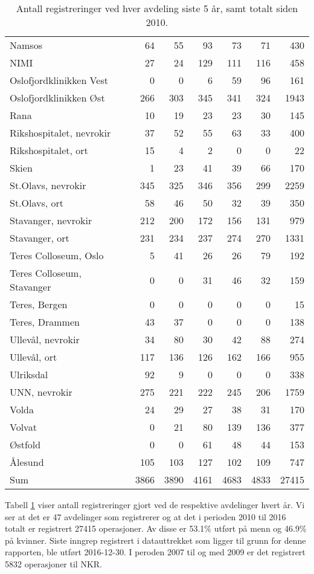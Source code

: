 \documentclass [norsk,a4paper,twoside]{article}\usepackage[]{graphicx}\usepackage[]{color}
\begin{document}
\begin{table}[ht]
\begin{tabular}{lrrrrrr}
  Namsos & 64 & 55 & 93 & 73 & 71 & 430 \\ 
  NIMI & 27 & 24 & 129 & 111 & 116 & 458 \\ 
  Oslofjordklinikken Vest & 0 & 0 & 6 & 59 & 96 & 161 \\ 
  Oslofjordklinikken Øst & 266 & 303 & 345 & 341 & 324 & 1943 \\ 
  Rana & 10 & 19 & 23 & 23 & 30 & 145 \\ 
  Rikshospitalet, nevrokir & 37 & 52 & 55 & 63 & 33 & 400 \\ 
  Rikshospitalet, ort & 15 & 4 & 2 & 0 & 0 & 22 \\ 
  Skien & 1 & 23 & 41 & 39 & 66 & 170 \\ 
  St.Olavs, nevrokir & 345 & 325 & 346 & 356 & 299 & 2259 \\ 
  St.Olavs, ort & 58 & 46 & 50 & 32 & 39 & 350 \\ 
  Stavanger, nevrokir & 212 & 200 & 172 & 156 & 131 & 979 \\ 
  Stavanger, ort & 231 & 234 & 237 & 274 & 270 & 1331 \\ 
  Teres Colloseum, Oslo & 5 & 41 & 26 & 26 & 79 & 192 \\ 
  Teres Colloseum, Stavanger & 0 & 0 & 31 & 46 & 32 & 159 \\ 
  Teres, Bergen & 0 & 0 & 0 & 0 & 0 & 15 \\ 
  Teres, Drammen & 43 & 37 & 0 & 0 & 0 & 138 \\ 
  Ullevål, nevrokir & 34 & 80 & 30 & 42 & 88 & 274 \\ 
  Ullevål, ort & 117 & 136 & 126 & 162 & 166 & 955 \\ 
  Ulriksdal & 92 & 9 & 0 & 0 & 0 & 338 \\ 
  UNN, nevrokir & 275 & 221 & 222 & 245 & 206 & 1759 \\ 
  Volda & 24 & 29 & 27 & 38 & 31 & 170 \\ 
  Volvat & 0 & 21 & 80 & 139 & 136 & 377 \\ 
  Østfold & 0 & 0 & 61 & 48 & 44 & 153 \\ 
  Ålesund & 105 & 103 & 127 & 102 & 109 & 747 \\ 
  Sum & 3866 & 3890 & 4161 & 4683 & 4833 & 27415 \\ 
   \hline
\end{tabular}
\caption{Antall registreringer ved hver avdeling siste 5 år, samt totalt siden 2010.} 
\label{tab:AntReg}
\end{table}


Tabell \ref{tab:AntReg} viser antall 
registreringer gjort ved de respektive avdelinger hvert år. Vi ser at det er  
47 avdelinger som registrerer og at det i perioden 2010 til 2016 totalt er registrert 27415 
operasjoner. Av disse er 53.1\% utført på menn og 46.9\% på kvinner.
Siste inngrep registrert i datauttrekket som ligger til grunn for denne rapporten, ble utført 
2016-12-30. I peroden 2007 til og med 2009 er det registrert 5832 operasjoner til NKR. 
\end{document}
